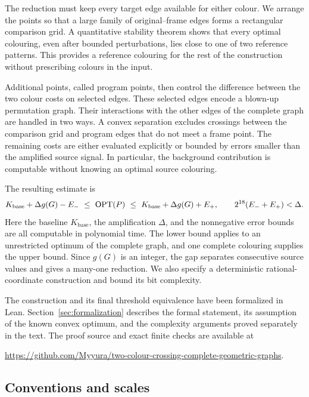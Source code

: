 The reduction must keep every target edge available for either colour.
We arrange the points so that a large family of original--frame edges
forms a rectangular comparison grid. A quantitative stability theorem
shows that every optimal colouring, even after bounded perturbations,
lies close to one of two reference patterns. This provides a reference colouring for the
rest of the construction without prescribing colours in the input.

Additional points, called program points, then control the difference
between the two colour costs on selected edges. These selected edges
encode a blown-up permutation graph. Their interactions with the other
edges of the complete graph are handled in two ways. A convex separation
excludes crossings between the comparison grid and program edges that
do not meet a frame point. The remaining costs are either evaluated
explicitly or bounded by errors smaller than the amplified source signal.
In particular, the background contribution is computable without knowing
an optimal source colouring.

The resulting estimate is
\begin{equation}\label{eq:main-sandwich}
 K_{\mathrm{base}}+\Delta g(G)-E_-
 \ \leq\ \operatorname{OPT}(P)\ \leq\
 K_{\mathrm{base}}+\Delta g(G)+E_+,
 \qquad 2^{18}(E_-+E_+)<\Delta.
\end{equation}
Here the baseline $K_{\mathrm{base}}$, the amplification $\Delta$, and
the nonnegative error bounds are all computable in polynomial time.
The lower bound applies to an unrestricted optimum of the complete
graph, and one complete colouring supplies the upper bound. Since $g(G)$
is an integer, the gap separates consecutive source values and gives a
many-one reduction. We also specify a deterministic rational-coordinate
construction and bound its bit complexity.

The construction and its final threshold equivalence have been formalized
in Lean. Section~\ref{sec:formalization} describes the formal statement,
its assumption of the known convex optimum, and the complexity arguments
proved separately in the text. The proof source and exact finite checks
are available at
\begin{center}
\small\url{https://github.com/Myyura/two-colour-crossing-complete-geometric-graphs}.
\end{center}

\subsection{Conventions and scales}

